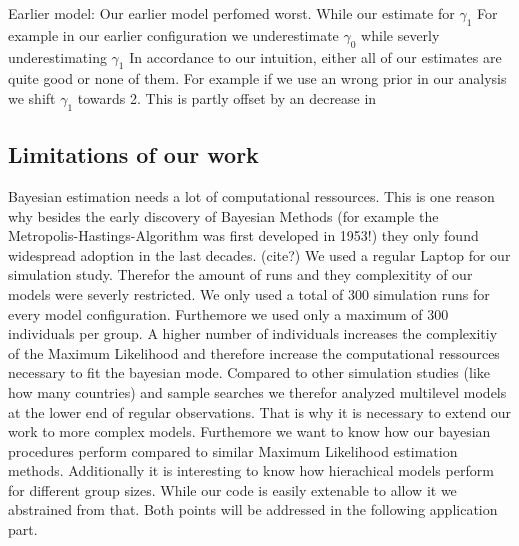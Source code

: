 Earlier model:
Our earlier model perfomed worst. While our estimate for $\gamma_1$
For example in our earlier configuration we underestimate $\gamma_0$ while severly underestimating $\gamma_1$ 
In accordance to our intuition, either all of our estimates are quite good or none of them. For example if we use an wrong prior in our analysis we shift $\gamma_1$ towards 2. This is partly offset by an decrease in 


\subsection{Limitations of our work}
Bayesian estimation needs a lot of computational ressources. This is one reason why besides the early discovery of Bayesian Methods (for example the  Metropolis-Hastings-Algorithm was first developed in 1953!) they only found widespread adoption in the last decades. (cite?)
We used a regular Laptop for our simulation study. Therefor the amount of runs and they complexitity of our models were severly restricted. 
We only used a total of 300 simulation runs for every model configuration. Furthemore we used only a maximum of 300 individuals per group. A higher number of individuals increases the complexitiy of the Maximum Likelihood and therefore increase the computational ressources necessary to fit the bayesian mode.
Compared to other simulation studies (like how many countries) and sample searches we therefor analyzed multilevel models at the lower end of regular observations. That is why it is necessary to extend our work to more complex models.
Furthemore we want to know how our bayesian procedures perform compared to similar Maximum Likelihood estimation methods. Additionally it is interesting to know how hierachical models perform for different group sizes. While our code is easily extenable to allow it we abstrained from that. 
Both points will be addressed in the following application part.